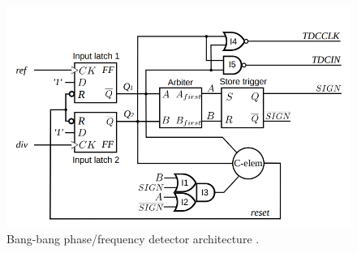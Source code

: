 \begin{figure}[h]
	\centering
	\includegraphics[scale=0.35]{../shan_bb_pd}
	\caption[Bang-bang phase/frequency detector architecture]{Bang-bang phase/frequency detector architecture \cite{shan2014phd}.}
	\label{fig:shan_bb_pd}
\end{figure}

